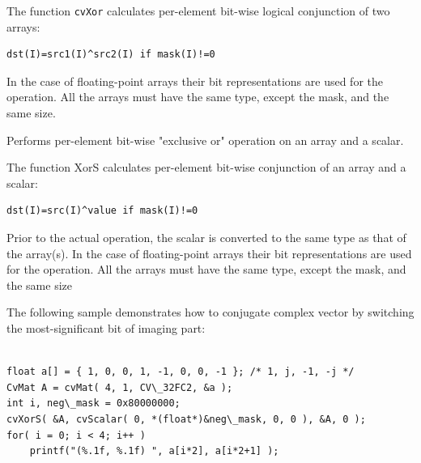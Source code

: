\begin{description}
\end{description}

The function \texttt{cvXor} calculates per-element bit-wise logical conjunction of two arrays:

\begin{lstlisting}
dst(I)=src1(I)^src2(I) if mask(I)!=0
\end{lstlisting}

In the case of floating-point arrays their bit representations are used for the operation. All the arrays must have the same type, except the mask, and the same size.

\label{XorS}

Performs per-element bit-wise "exclusive or" operation on an array and a scalar.


\begin{description}
\end{description}


The function XorS calculates per-element bit-wise conjunction of an array and a scalar:

\begin{lstlisting}
dst(I)=src(I)^value if mask(I)!=0
\end{lstlisting}

Prior to the actual operation, the scalar is converted to the same type as that of the array(s). In the case of floating-point arrays their bit representations are used for the operation. All the arrays must have the same type, except the mask, and the same size

The following sample demonstrates how to conjugate complex vector by switching the most-significant bit of imaging part:

\begin{lstlisting}

float a[] = { 1, 0, 0, 1, -1, 0, 0, -1 }; /* 1, j, -1, -j */
CvMat A = cvMat( 4, 1, CV\_32FC2, &a );
int i, neg\_mask = 0x80000000;
cvXorS( &A, cvScalar( 0, *(float*)&neg\_mask, 0, 0 ), &A, 0 );
for( i = 0; i < 4; i++ )
    printf("(%.1f, %.1f) ", a[i*2], a[i*2+1] );

\end{lstlisting}

